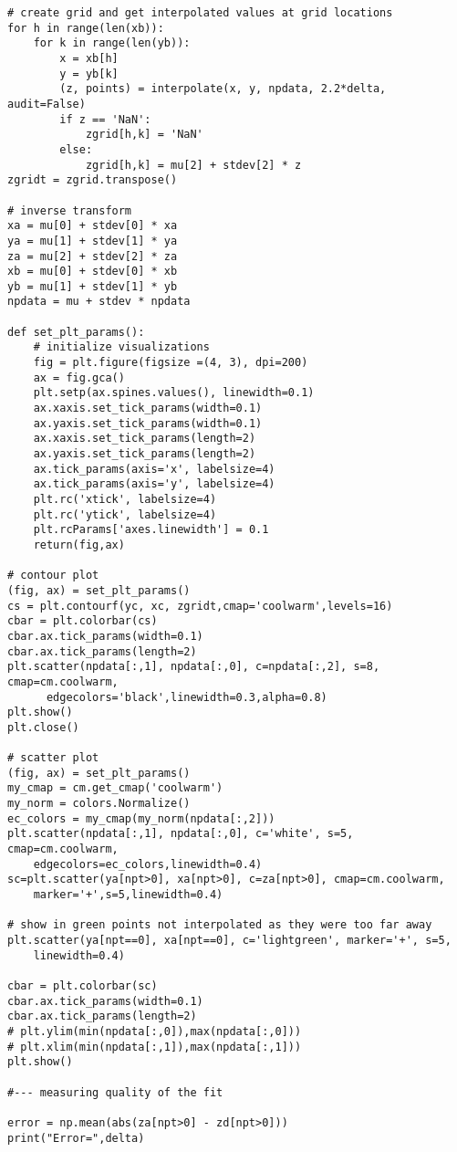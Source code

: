 \documentclass[oneside,10pt]{book}
\begin{document}
\begin{lstlisting}
# create grid and get interpolated values at grid locations
for h in range(len(xb)):
    for k in range(len(yb)):
        x = xb[h]
        y = yb[k]
        (z, points) = interpolate(x, y, npdata, 2.2*delta, audit=False)
        if z == 'NaN':
            zgrid[h,k] = 'NaN'
        else:
            zgrid[h,k] = mu[2] + stdev[2] * z
zgridt = zgrid.transpose()

# inverse transform
xa = mu[0] + stdev[0] * xa
ya = mu[1] + stdev[1] * ya
za = mu[2] + stdev[2] * za
xb = mu[0] + stdev[0] * xb
yb = mu[1] + stdev[1] * yb
npdata = mu + stdev * npdata

def set_plt_params():
    # initialize visualizations
    fig = plt.figure(figsize =(4, 3), dpi=200)
    ax = fig.gca()
    plt.setp(ax.spines.values(), linewidth=0.1)
    ax.xaxis.set_tick_params(width=0.1)
    ax.yaxis.set_tick_params(width=0.1)
    ax.xaxis.set_tick_params(length=2)
    ax.yaxis.set_tick_params(length=2)
    ax.tick_params(axis='x', labelsize=4)
    ax.tick_params(axis='y', labelsize=4)
    plt.rc('xtick', labelsize=4)
    plt.rc('ytick', labelsize=4)
    plt.rcParams['axes.linewidth'] = 0.1
    return(fig,ax)

# contour plot
(fig, ax) = set_plt_params()
cs = plt.contourf(yc, xc, zgridt,cmap='coolwarm',levels=16)
cbar = plt.colorbar(cs)
cbar.ax.tick_params(width=0.1)
cbar.ax.tick_params(length=2)
plt.scatter(npdata[:,1], npdata[:,0], c=npdata[:,2], s=8, cmap=cm.coolwarm,
      edgecolors='black',linewidth=0.3,alpha=0.8)
plt.show()
plt.close()

# scatter plot
(fig, ax) = set_plt_params()
my_cmap = cm.get_cmap('coolwarm')
my_norm = colors.Normalize()
ec_colors = my_cmap(my_norm(npdata[:,2]))
plt.scatter(npdata[:,1], npdata[:,0], c='white', s=5, cmap=cm.coolwarm,
    edgecolors=ec_colors,linewidth=0.4)
sc=plt.scatter(ya[npt>0], xa[npt>0], c=za[npt>0], cmap=cm.coolwarm,
    marker='+',s=5,linewidth=0.4)

# show in green points not interpolated as they were too far away
plt.scatter(ya[npt==0], xa[npt==0], c='lightgreen', marker='+', s=5,
    linewidth=0.4)

cbar = plt.colorbar(sc)
cbar.ax.tick_params(width=0.1)
cbar.ax.tick_params(length=2)
# plt.ylim(min(npdata[:,0]),max(npdata[:,0]))
# plt.xlim(min(npdata[:,1]),max(npdata[:,1]))
plt.show()

#--- measuring quality of the fit

error = np.mean(abs(za[npt>0] - zd[npt>0]))
print("Error=",delta)
\end{lstlisting}
\end{document}
